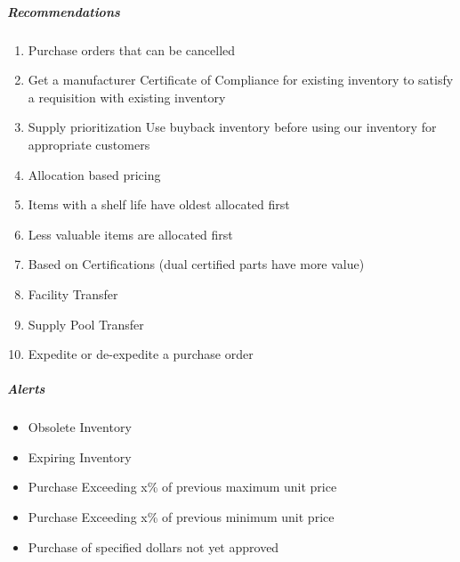 \documentclass[letterpaper,10pt,english]{sphinxmanual}
\begin{document}
\subparagraph{Recommendations}
\label{\detokenize{FutureState:recommendations}}\begin{enumerate}
%
\item {} 
Purchase orders that can be cancelled

\item {} 
Get a manufacturer Certificate of Compliance for existing inventory
to satisfy a requisition with existing inventory

\item {} 
Supply prioritization Use buyback inventory before using our
inventory for appropriate customers

\item {} 
Allocation based pricing

\item {} 
Items with a shelf life have oldest allocated first

\item {} 
Less valuable items are allocated first

\item {} 
Based on Certifications (dual certified parts have more value)

\item {} 
Facility Transfer

\item {} 
Supply Pool Transfer

\item {} 
Expedite or de-expedite a purchase order

\end{enumerate}


\subparagraph{Alerts}
\label{\detokenize{FutureState:alerts}}\begin{itemize}
\item {} 
Obsolete Inventory

\item {} 
Expiring Inventory

\item {} 
Purchase Exceeding x\% of previous maximum unit price

\item {} 
Purchase Exceeding x\% of previous minimum unit price

\item {} 
Purchase of specified dollars not yet approved

\end{itemize}
\end{document}
